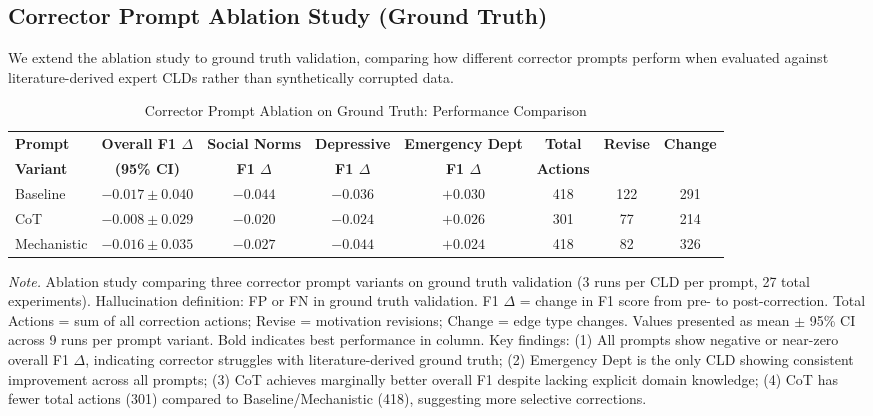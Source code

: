 \subsection{Corrector Prompt Ablation Study (Ground Truth)}

We extend the ablation study to ground truth validation, comparing how different corrector prompts perform when evaluated against literature-derived expert CLDs rather than synthetically corrupted data.

\begin{table}[H]
\centering
\caption{Corrector Prompt Ablation on Ground Truth: Performance Comparison}
\label{tab:rq1b_prompt_ablation_groundtruth}
\begin{threeparttable}
\begin{tabular}{lccccccc}
\toprule
\textbf{Prompt} & \textbf{Overall F1 $\Delta$} & \textbf{Social Norms} & \textbf{Depressive} & \textbf{Emergency Dept} & \textbf{Total} & \textbf{Revise} & \textbf{Change} \\
\textbf{Variant} & \textbf{(95\% CI)} & \textbf{F1 $\Delta$} & \textbf{F1 $\Delta$} & \textbf{F1 $\Delta$} & \textbf{Actions} & & \\
\midrule
Baseline        & $-0.017 \pm 0.040$ & $-0.044$ & $-0.036$ & $\mathbf{+0.030}$ & 418 & 122 & 291 \\
\midrule
CoT             & $\mathbf{-0.008 \pm 0.029}$ & $-0.020$ & $\mathbf{-0.024}$ & $+0.026$ & 301 & 77 & 214 \\
\midrule
Mechanistic     & $-0.016 \pm 0.035$ & $\mathbf{-0.027}$ & $-0.044$ & $+0.024$ & 418 & 82 & 326 \\
\bottomrule
\end{tabular}
\begin{tablenotes}
\small
\item \textit{Note.} Ablation study comparing three corrector prompt variants on ground truth validation (3 runs per CLD per prompt, 27 total experiments). 
Hallucination definition: FP or FN in ground truth validation.
F1 $\Delta$ = change in F1 score from pre- to post-correction.
Total Actions = sum of all correction actions; Revise = motivation revisions; Change = edge type changes.
Values presented as mean $\pm$ 95\% CI across 9 runs per prompt variant.
Bold indicates best performance in column.
Key findings: (1) All prompts show negative or near-zero overall F1 $\Delta$, indicating corrector struggles with literature-derived ground truth; (2) Emergency Dept is the only CLD showing consistent improvement across all prompts; (3) CoT achieves marginally better overall F1 despite lacking explicit domain knowledge; (4) CoT has fewer total actions (301) compared to Baseline/Mechanistic (418), suggesting more selective corrections.
\end{tablenotes}
\end{threeparttable}
\end{table}

